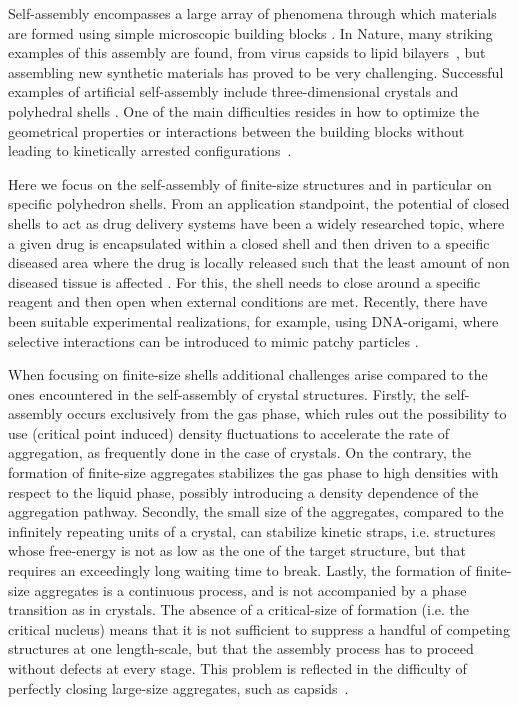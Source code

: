 \documentclass[a4paper, amsfonts, amssymb, amsmath, reprint, showkeys, nofootinbib, twoside]{revtex4-1}
\begin{document}
Self-assembly encompasses a large array of phenomena through which materials are formed using simple microscopic building blocks \cite{Whitelam2015}. In Nature, many striking examples of this assembly are found, from virus capsids to lipid bilayers~\cite{Whitesides2002, Parnell2015, Teyssier2015}, but assembling new synthetic materials has proved to be very challenging. Successful examples of artificial self-assembly include three-dimensional crystals and polyhedral shells \cite{Dziomkina2005, Glotzer2007, Kim2011, LaCour2022,  McGorty2010, Mu2022, Nykypanchuk2008, Sacanna2011, Wang2012, Wang2015, Joshi2016,Bishop2022}. One of the main difficulties resides in how to optimize the geometrical properties or interactions between the building blocks without leading to  kinetically arrested configurations~\cite{Frenkel2011, Lash2015, Blaaderen2006, Meulen2015}.

Here we focus on the self-assembly of finite-size structures and in particular on specific polyhedron shells. 
From an application standpoint, the potential of closed shells to act as drug delivery systems have been a widely researched topic, where a given drug is encapsulated within a closed shell and then driven to a specific diseased area where the drug is locally released such that the least amount of non diseased tissue is affected \cite{Huang2007, Uchida2007}. For this, the shell needs to close around a specific reagent and then open when external conditions are met. Recently, there have been suitable experimental realizations, for example, using DNA-origami, where selective interactions can be introduced to mimic patchy particles \cite{Mosayebi2017, Lee2022, Jun2021, Rothemund2006}.

When focusing on finite-size shells additional challenges arise compared to the ones encountered in the self-assembly of crystal structures. Firstly, the self-assembly occurs exclusively from the gas phase, which rules out the possibility to use (critical point induced) density fluctuations to accelerate the rate of aggregation, as frequently done in the case of crystals. On the contrary, the formation of finite-size aggregates stabilizes the gas phase to high densities with respect to the liquid phase, possibly introducing a density dependence of the aggregation pathway. Secondly, the small size of the aggregates, compared to the infinitely repeating units of a crystal, can stabilize kinetic straps, i.e. structures whose free-energy is not as low as the one of the target structure, but that requires an exceedingly long waiting time to break. Lastly, the formation of finite-size aggregates is a continuous process, and is not accompanied by a phase transition as in crystals. The absence of a critical-size of formation (i.e. the critical nucleus) means that it is not sufficient to suppress a handful of competing structures at one length-scale, but that the assembly process has to proceed without defects at every stage. This problem is reflected in the difficulty of perfectly closing large-size aggregates, such as capsids~\cite{Mosayebi2017}.
\end{document}
